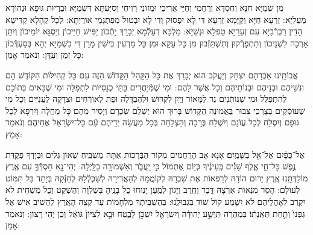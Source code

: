\documentclass[twoside, openany, parskip=half, 11pt]{book}
\begin{document}
 

 מִן שְׁמַיָּא חִנָּא וְחִסְדָּא וְרַחֲמֵי וְחַיֵּי אֲרִיכֵי וּמְזוֹנֵי רְוִיחֵי וְסִיַּעְתָּא דִּשְׁמַיָּא וּבַרְיוּת גּוּפָא וּנְהוֹרָא מַעַלְיָא: זַרְעָא חַיָּא וְקַיָּמָא זַרְעָא דִּי לָא יִפְסוּק וְדִי לָא יִבְטוּל מִפִּתְגָּמֵי אוֹרַיְתָא: לְכָל קְהָלָא קַדִּישָׁא הָדֵין רַבְרְֿבַיָּא עִם זְעֵרַיָּא טַפְלָא וּנְשַׁיָּא: מַלְכָּא דְעָלְֿמָא יְבָרֵךְ יָתְֿכוֹן יַפִּישׁ חַיֵּיכוֹן וְיַסְגֵּא יוֹמֵיכוֹן וְיִתֵּן אָרְכָה לִשְׁנֵיכוֹן וְתִתְפָּרְֿקוּן וְתִשְׁתֵּזְֿבוּן מִן כָּל עָקָא וּמִן כָּל מַרְעִין בִּישִׁין מָרָן דִּי בִשְׁמַיָּא יְהֵא בְּסַעְדְּֿכוֹן כָּל זְמַן וְעִדָּן: וְנֹאמַר אָמֵן: 

 אֲבוֹתֵֽינוּ אַבְרָהָם יִצְחָק וְיַעֲקֹב הוּא יְבָרֵךְ אֶת כָּל הַקָּהָל הַקָּדוֹשׁ הַזֶּה עִם כָּל קְהִילּוֹת הַקּוֹדֶשׁ הֵם וּנְשֵׁיהֶם וּבְנֵיהֶם וּבְנוֹתֵיהֶם וְכָל אֲשֶׁר לָהֶם: וּמִי שֶׁמְּֿיַחֲדִים בָּתֵּי כְנֵסִיּוֹת לִתְפִלָּה וּמִי שֶׁבָּאִים בְּתוֹכָם לְהִתְפַּלֵּל וּמִי שֶׁנּוֹתְֿנִים נֵר לַמָּאוֹר וְיַֽיִן לְקִדּוּשׁ וּלְהַבְדָּלָה וּפַת לְאוֹרְֿחִים וּצְדָקָה לַעֲנִיִּים וְכָל מִי שֶׁעוֹסְֿקִים בְּצָרְכֵי צִבּוּר בֶּאֱמוּנָה הַקָּדוֹשׁ בָּרוּךְ הוּא יְשַׁלֵם שְׂכָרָם וְיָסִיר מֵהֶם כָּל מַחֲלָה וְיִרְפָּא לְכָל גּוּפָם וְיִסְלַח לְכָל עֲוֹנָם וְיִשְׁלַח בְּרָכָה וְהַצְלָחָה בְּכָל מַעֲשֵׂה יְדֵיהֶם עִ֕ם כָּל־יִשְׂרָאֵל אֲחֵיהֶם וְנֹאמַר אָמֵץ:





אֶל־כַּפָּ֔יִם אֶל־אֵ֖ל בַּשָּׁמָֽיִם׃ אָנָּא אָב הָרַחֲמִים מְקוֹר הַבְּֿרָכוֹת אַתָּה מַשְׁבִּֽיחַ שְׁאוֹן גַּלִּים וּבְיָדְךָ פְּקֻדַּת נֶ֣פֶשׁ כָּל־חָ֑י אֶ֢לֶף שָׁנִ֡ים בְּֽעֵינֶ֗יךָ כְּי֣וֹם אֶ֭תְמוֹל כִּ֣י יַֽעֲבֹ֑ר וְאַשְׁמוּרָ֥ה בַלָּֽיְלָה: יְהִי־נָ֣א חַסְדְּֿךָ֣ עִם אֶֽרֶץ מוֹלַדְּתֵּֽנוּ אֶֽרֶץ
 יָרוּם הוֹדָהּ לְרַפּאוֹת אֶת שִׁבְרָהּ לְקוֹמֲמָהּ לְהַאֲדִירָהּ לְשַׁכְלְֿלָהּ לְחַזְּֿקָהּ בְּיָתֵד בַּל תִּמּוֹט לְעוֹלָם: הָסֵר מִנְּֿאוֹת אַרְצָהּ דֶּֽבֶר וְחֶֽרֶב וְיָגוֹן לְמַֽעַן יָנֽוּחוּ כָל בָּנֶֽיהָ בְּשַׁלְוָה וְהַשְׁקֵט וְכָל מַשְׁחִית לֹא יִקְרַב לְאָהֳלֵיהֶם לֹא יִשָּׁמַע קוֹל שׁוֹד בִּגְבוּלֵֽנוּ: בְּהַשְׁבִּיתְֿךָ מִלְחָמוֹת עַד קְצֵה הָאָֽרֶץ לְהָשִׁיב אִישׁ אֶל  גַּפְנוֹ֙ וְתַ֣חַת תְּאֵֽנָת֔וֹ׃ בִּמְהֵרָה תִּוָּשַׁ֣ע יְהוּדָ֔ה וְיִשְׂרָאֵ֖ל יִשְׁכֹּ֣ן לָבֶ֑טַח 
 וּבָ֤א לְצִיּוֹן֙ גּוֹאֵ֔ל וְכֵן יְהִי רָצוֹן: וְנֹאמַר אָמֵן:
 
\clearpage


\end{document}
